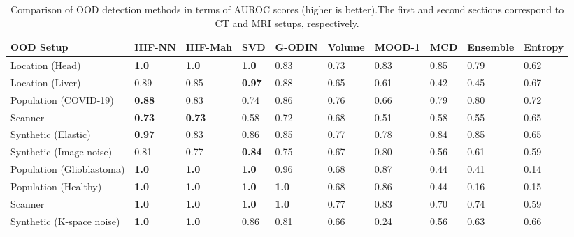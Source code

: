 

\begin{landscape}
\begin{table}[p]
	\centering
	\caption{Comparison of OOD detection methods in terms of AUROC scores (higher is better).The first and second sections correspond to CT and MRI setups, respectively.}%
		\begin{tabular}{llllllllll}
			\toprule
			OOD Setup &            IHF-NN &             IHF-Mah &             SVD &           G-ODIN &   Volume & MOOD-1 &   MCD & Ensemble &   Entropy \\
			\midrule
			Location (Head)           &  \textbf{1.0}  &  \textbf{1.0}  &  \textbf{1.0}  &            0.83 &  0.73 &       0.83 &  0.85 &     0.79 &  0.62 \\
			Location (Liver)          &            0.89 &            0.85 &  \textbf{0.97}  &            0.88 &  0.65 &       0.61 &  0.42 &     0.45 &  0.67 \\
			Population (COVID-19)     &  \textbf{0.88}  &            0.83 &            0.74 &            0.86 &  0.76 &       0.66 &  0.79 &     0.80 &  0.72 \\
			Scanner                 &  \textbf{0.73}  &  \textbf{0.73}  &            0.58 &            0.72 &  0.68 &       0.51 &  0.58 &     0.55 &  0.65 \\
			Synthetic (Elastic)       &  \textbf{0.97}  &            0.83 &            0.86 &            0.85 &  0.77 &       0.78 &  0.84 &     0.85 &  0.65 \\
			Synthetic (Image noise)  &            0.81 &            0.77 &  \textbf{0.84}  &            0.75 &  0.67 &       0.80 &  0.56 &     0.61 &  0.59 \\
			\midrule
			Population (Glioblastoma) &  \textbf{1.0}  &  \textbf{1.0}  &  \textbf{1.0}  &            0.96 &  0.68 &       0.87 &  0.44 &     0.41 &  0.14 \\
			Population (Healthy)      &  \textbf{1.0}  &  \textbf{1.0}  &  \textbf{1.0}  &  \textbf{1.0}  &  0.68 &       0.86 &  0.44 &     0.16 &  0.15 \\
			Scanner                   &  \textbf{1.0}  &  \textbf{1.0}  &  \textbf{1.0}  &  \textbf{1.0}  &  0.77 &       0.83 &  0.70 &     0.74 &  0.59 \\
			Synthetic (K-space noise) &  \textbf{1.0}  &  \textbf{1.0}  &            0.86 &            0.81 &  0.66 &       0.24 &  0.56 &     0.63 &  0.66 \\

\end{tabular}
\end{table}
\end{landscape}

